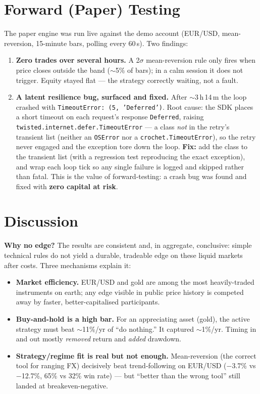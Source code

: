 \documentclass[11pt,a4paper]{article}
\newcommand{\tbot}[1]{\texttt{#1}}
\begin{document}
\section{Forward (Paper) Testing}\label{sec:forward}
The paper engine was run live against the demo account (EUR/USD, mean-reversion, 15-minute bars, polling every 60\,s). Two findings:
\begin{enumerate}[leftmargin=1.6em]
  \item \textbf{Zero trades over several hours.} A 2$\sigma$ mean-reversion rule only fires when price closes outside the band ($\sim$5\% of bars); in a calm session it does not trigger. Equity stayed flat --- the strategy correctly waiting, not a fault.
  \item \textbf{A latent resilience bug, surfaced and fixed.} After $\sim$3\,h\,14\,m the loop crashed with \tbot{TimeoutError: (5, 'Deferred')}. Root cause: the SDK places a short timeout on each request's response \tbot{Deferred}, raising \tbot{twisted.internet.defer.TimeoutError} --- a class \emph{not} in the retry's transient list (neither an \tbot{OSError} nor a \tbot{crochet.TimeoutError}), so the retry never engaged and the exception tore down the loop. \textbf{Fix:} add the class to the transient list (with a regression test reproducing the exact exception), and wrap each loop tick so any single failure is logged and skipped rather than fatal. This is the value of forward-testing: a crash bug was found and fixed with \textbf{zero capital at risk}.
\end{enumerate}

\section{Discussion}
\textbf{Why no edge?} The results are consistent and, in aggregate, conclusive: simple technical rules do not yield a durable, tradeable edge on these liquid markets after costs. Three mechanisms explain it:
\begin{itemize}[leftmargin=1.4em]
  \item \textbf{Market efficiency.} EUR/USD and gold are among the most heavily-traded instruments on earth; any edge visible in public price history is competed away by faster, better-capitalised participants.
  \item \textbf{Buy-and-hold is a high bar.} For an appreciating asset (gold), the active strategy must beat $\sim$11\%/yr of ``do nothing.'' It captured $\sim$1\%/yr. Timing in and out mostly \emph{removed} return and \emph{added} drawdown.
  \item \textbf{Strategy/regime fit is real but not enough.} Mean-reversion (the correct tool for ranging FX) decisively beat trend-following on EUR/USD ($-$3.7\% vs $-$12.7\%, 65\% vs 32\% win rate) --- but ``better than the wrong tool'' still landed at breakeven-negative.
\end{itemize}
\end{document}
